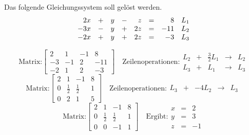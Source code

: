 \begin{example}
  Das folgende Gleichungssystem soll gelöst werden.
  \begin{equation*}
    \begin{array}{rcrcrcr r}
      2x &+& y &-& z &=& 8 & L_1\\
      -3x &-& y &+& 2z &=& -11 & L_2 \\
      -2x &+& y &+& 2z &=& -3 & L_3
    \end{array}
  \end{equation*}
\begin{solution}
  \begin{equation*}
    \text{Matrix:}\left[\begin{array}{rrr|r}
      2 & 1 & -1 & 8 \\
      -3 & -1 & 2 & -11 \\
      -2 & 1 & 2 & -3
    \end{array}\right]\quad\text{Zeilenoperationen:}
    \begin{array}{rcrcr}
      L_2 &+& \frac{3}{2}L_1 &\to& L_2 \\
      L_3 &+& L_1 &\to& L_3
    \end{array}
  \end{equation*}
  \begin{equation*}
    \text{Matrix:}\left[\begin{array}{rrr|r}
      2 & 1 & -1 & 8 \\
      0 & \frac{1}{2} & \frac{1}{2} & 1 \\
      0 & 2 & 1 & 5
    \end{array}\right]\quad\text{Zeilenoperationen:}
    \begin{array}{rcrcr}
      L_3 &+& -4L_2 &\to& L_3
    \end{array}
  \end{equation*}
  \begin{equation*}
    \text{Matrix:}\left[\begin{array}{rrr|r}
      2 & 1 & -1 & 8 \\
      0 & \frac{1}{2} & \frac{1}{2} & 1 \\
      0 & 0 & -1 & 1
    \end{array}\right]\quad\text{Ergibt:}
    \begin{array}{rcr}
      x &=& 2\\
      y &=& 3\\
      z &=& -1
    \end{array}
  \end{equation*}
\end{solution}
\end{example}
